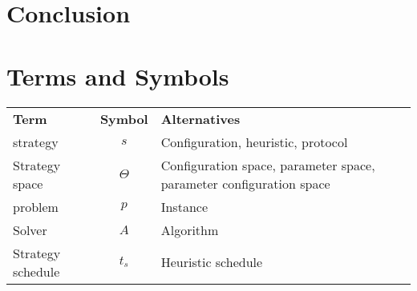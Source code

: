 \documentclass[twoside]{ctuthesis}
\begin{document}
\maketitle







\chapter{Conclusion}



\appendix



\chapter{Terms and Symbols}

\begin{tabularx}{\linewidth}
{ l c >{\raggedright\arraybackslash}X }
\bfseries Term & \bfseries Symbol & \bfseries Alternatives \\
\Midrule
\Gls{strategy} & $s$ & Configuration, heuristic, protocol \\
Strategy space & $\Theta$ & Configuration space, parameter space, parameter configuration space \\
\Gls{problem} & $p$ & Instance \\
Solver & $A$ & Algorithm \\
Strategy schedule & $t_s$ & Heuristic schedule \\
\end{tabularx}

\printglossaries






\end{document}
